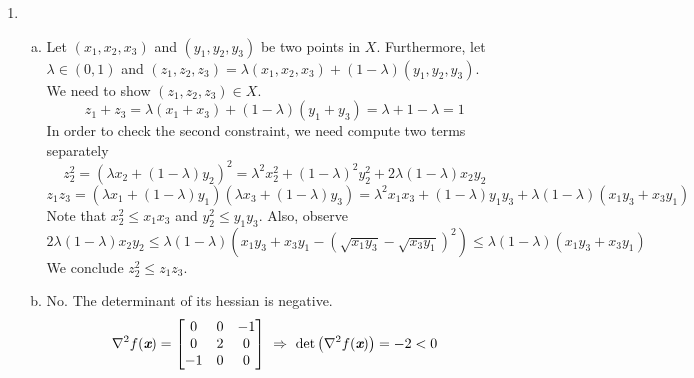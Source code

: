 \begin{enumerate}
	\newpage
	\item
%		
%		
		\begin{enumerate}[(a)]
			\item Let $(x_1,x_2,x_3)$ and $(y_1, y_2, y_3)$ be two points in $X$. Furthermore, let $\lambda\in (0,1)$ and $(z_1,z_2,z_3) = \lambda(x_1,x_2,x_3)+(1-\lambda)(y_1,y_2,y_3)$. We need to show $(z_1,z_2,z_3)\in X$. 
			$$
			z_1+z_3 = \lambda(x_1+x_3) + (1-\lambda)(y_1+y_3) = \lambda+1-\lambda = 1
			$$
			In order to check the second constraint, we need compute two terms separately
			$$
			z_2^2 = (\lambda x_2 + (1-\lambda)y_2)^2 = \lambda^2x_2^2 + (1-\lambda)^2y_2^2 + 2\lambda(1-\lambda)x_2y_2
			$$
			$$
			z_1z_3 = (\lambda x_1 + (1-\lambda)y_1)(\lambda x_3 + (1-\lambda)y_3) = \lambda^2 x_1x_3 + (1-\lambda)y_1y_3 + \lambda(1-\lambda)(x_1y_3+x_3y_1)
			$$
			Note that $x_2^2\le x_1x_3$ and $y_2^2\le y_1y_3$. Also, observe
			$$
			2\lambda(1-\lambda)x_2y_2 \le \lambda(1-\lambda)\left(x_1y_3+x_3y_1 - \left(\sqrt{x_1y_3}-\sqrt{x_3y_1}\right)^2 \right) \le \lambda(1-\lambda)(x_1y_3+x_3y_1)
			$$
			We conclude $z_2^2 \le z_1z_3$.
			
			\item No. The determinant of its hessian is negative.
			\[
			\nabla^2 f(\textit{\textbf{x}})  =\begin{bmatrix}
			0 & 0 & -1\\
			0 & 2 & 0\\ -1 & 0 & 0
			\end{bmatrix} ~\Rightarrow~ \det\left(\nabla^2 f(\textit{\textbf{x}}) \right) = -2 < 0
			\]
			

\end{enumerate}
\end{enumerate}
